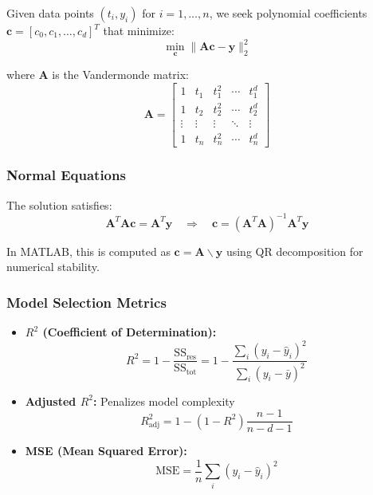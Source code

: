 \documentclass[12pt,a4paper]{article}
\begin{document}
Given data points $(t_i, y_i)$ for $i = 1, \ldots, n$, we seek polynomial coefficients $\mathbf{c} = [c_0, c_1, \ldots, c_d]^T$ that minimize:
\begin{equation}
    \min_{\mathbf{c}} \|\mathbf{A}\mathbf{c} - \mathbf{y}\|_2^2
\end{equation}

where $\mathbf{A}$ is the Vandermonde matrix:
\begin{equation}
    \mathbf{A} = \begin{bmatrix}
        1 & t_1 & t_1^2 & \cdots & t_1^d \\
        1 & t_2 & t_2^2 & \cdots & t_2^d \\
        \vdots & \vdots & \vdots & \ddots & \vdots \\
        1 & t_n & t_n^2 & \cdots & t_n^d
    \end{bmatrix}
\end{equation}

\subsubsection{Normal Equations}

The solution satisfies:
\begin{equation}
    \mathbf{A}^T\mathbf{A}\mathbf{c} = \mathbf{A}^T\mathbf{y} \quad \Rightarrow \quad \mathbf{c} = (\mathbf{A}^T\mathbf{A})^{-1}\mathbf{A}^T\mathbf{y}
\end{equation}

In MATLAB, this is computed as $\mathbf{c} = \mathbf{A} \backslash \mathbf{y}$ using QR decomposition for numerical stability.

\subsubsection{Model Selection Metrics}

\begin{itemize}
    \item \textbf{$R^2$ (Coefficient of Determination):}
    \begin{equation}
        R^2 = 1 - \frac{\text{SS}_{\text{res}}}{\text{SS}_{\text{tot}}} = 1 - \frac{\sum_i (y_i - \hat{y}_i)^2}{\sum_i (y_i - \bar{y})^2}
    \end{equation}
    
    \item \textbf{Adjusted $R^2$:} Penalizes model complexity
    \begin{equation}
        R^2_{\text{adj}} = 1 - (1 - R^2) \frac{n-1}{n-d-1}
    \end{equation}
    
    \item \textbf{MSE (Mean Squared Error):}
    \begin{equation}
        \text{MSE} = \frac{1}{n} \sum_i (y_i - \hat{y}_i)^2
    \end{equation}
\end{itemize}
\end{document}
